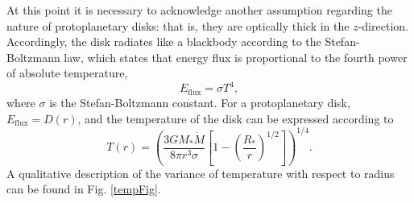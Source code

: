 \documentclass[aps,pra, twocolumn]{revtex4-1}
\begin{document}
At this point it is necessary to acknowledge another assumption regarding the nature of protoplanetary disks: that is, they are optically thick in the $z$-direction.  Accordingly, the disk radiates like a blackbody according to the Stefan-Boltzmann law, which states that energy flux is proportional to the fourth power of absolute temperature,
\begin{equation}
E_{\text{flux}} = \sigma T^4,
\end{equation}
where $\sigma$ is the Stefan-Boltzmann constant.  For a protoplanetary disk, $E_\text{flux} = D(r)$, and the temperature of the disk can be expressed according to \cite{armitage2011, king2002}
\begin{equation}
T(r) = \left( \frac{3GM_*\dot{M}}{8\pi r^3 \sigma}\left[ 1 - \left( \frac{R_*}{r}\right)^{1/2}\right] \right)^{1/4}. \label{tempEq}
\end{equation}
A qualitative description of the variance of temperature with respect to radius can be found in Fig. \ref{tempFig}.
\end{document}
